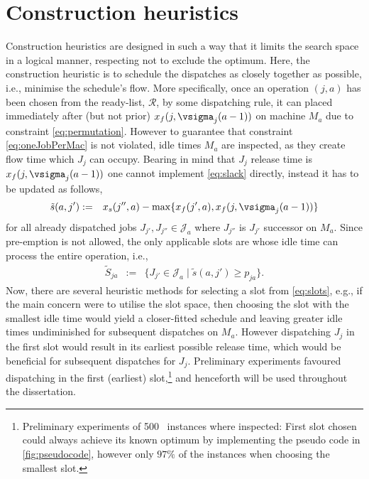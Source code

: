 \section{Construction heuristics}\label{sec:CH}
Construction heuristics are designed in such a way that it limits the search space in a logical manner, respecting not to exclude the optimum. Here, the construction heuristic is to schedule the dispatches as closely together as possible, i.e., minimise the schedule's flow. 
More specifically, once an operation $(j,a)$ has been chosen from the ready-list, $\mathcal{R}$, by some dispatching rule, it can placed immediately after (but not prior) $x_f(j,\vsigma_j(a-1))$ on machine $M_a$ due to constraint \cref{eq:permutation}. 
However to guarantee that constraint \cref{eq:oneJobPerMac} is not violated, idle times $M_a$ are inspected, as they create flow time  which $J_j$ can occupy. Bearing in mind that $J_j$ release time is $x_f(j,\vsigma_j(a-1))$ one cannot implement \cref{eq:slack} directly, instead it has to be updated as follows,
\begin{eqnarray}
\tilde{s}(a,j')&:=& x_s(j'',a)-\max\{x_f(j',a),x_f(j,\vsigma_j(a-1))\} %
\end{eqnarray}
for all already dispatched jobs $J_{j'},J_{j''}\in \mathcal{J}_a$ where $J_{j''}$ is $J_{j'}$ successor on $M_a$. Since pre-emption is not allowed, the only applicable slots are whose idle time can process the entire operation, i.e.,
\begin{eqnarray}
\tilde{S}_{ja}&:=&\{J_{j'}\in \mathcal{J}_a\;|\;\tilde{s}(a,j')\geq p_{ja} \}\label{eq:slots}.
\end{eqnarray} 
Now, there are several heuristic methods for selecting a slot from \cref{eq:slots}, e.g., if the main concern were to utilise the slot space, then choosing the slot with the smallest idle time would yield a closer-fitted schedule and leaving greater idle times undiminished for subsequent dispatches on $M_a$. However dispatching $J_j$ in the first slot would result in its earliest possible release time, which would be beneficial for subsequent dispatches for $J_j$. Preliminary experiments favoured dispatching in the first (earliest) slot,\footnote{Preliminary experiments of 500 \JSP\ instances where inspected: First slot chosen could always achieve its known optimum by implementing the pseudo code in \cref{fig:pseudocode}, however only $97\%$ of the instances when choosing the smallest slot.} and henceforth will be used throughout the dissertation.

